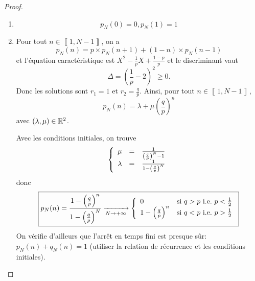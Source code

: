 \documentclass[12pt]{article}
\begin{document}
\begin{proof}
    \phantom{}
    \begin{enumerate}
        \item 
        \begin{equation}
            \boxed{p_{N}(0)=0,p_{N}(1)=1}    
        \end{equation}

        \item Pour tout $n\in\left\llbracket 1,N-1\right\rrbracket$, on a 
        \begin{equation}
            p_{N}(n)=p\times p_{N}(n+1)+(1-n)\times p_{N}(n-1)
        \end{equation}
        et l'équation caractéristique est $X^{2}-\frac{1}{p}X+\frac{1-p}{p}$ et le discriminant vaut 
        \begin{equation*}
            \Delta=\left(\frac{1}{p}-2\right)^{2}\geqslant0.
        \end{equation*}Donc les solutions sont $r_{1}=1$ et $r_{2}=\frac{q}{p}$. Ainsi, pour tout $n\in\left\llbracket 1,N-1\right\rrbracket$,
        \begin{equation}
            p_{N}(n)=\lambda+\mu\left(\frac{q}{p}\right)^{n}
        \end{equation}
        avec $\left(\lambda,\mu\right)\in\mathbb{R}^{2}$.
        
        Avec les conditions initiales, on trouve 
        \begin{equation}
            \left\{
                \begin{array}[]{rcl}
                    \mu &= &\frac{1}{\left(\frac{q}{p}\right)^{N}-1}\\
                    \lambda &= &\frac{1}{1-\left(\frac{q}{p}\right)^{N}}
                \end{array}
            \right.
        \end{equation}
        donc 
        \begin{equation}
            \boxed{
            p_{N}(n)=\frac{1-\left(\frac{q}{p}\right)^{n}}{1-\left(\frac{q}{p}\right)^{N}}\xrightarrow[N\to+\infty]{}
            \left\{
                \begin{array}[]{ll}
                    0 &\text{si }q>p\text{ i.e.~}p<\frac{1}{2}\\
                    1-\left(\frac{q}{p}\right)^{n} &\text{si }q<p\text{ i.e.~}p>\frac{1}{2}
                \end{array}
            \right.}
        \end{equation}
        On vérifie d'ailleurs que l'arrêt en temps fini est presque sûr: $p_{N}(n)+q_{N}(n)=1$ (utiliser la relation de récurrence et les conditions initiales).
    \end{enumerate}
\end{proof}
\end{document}
